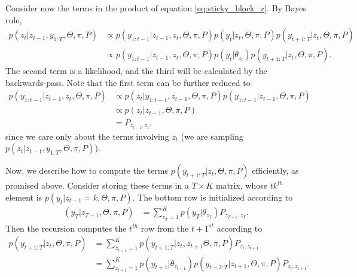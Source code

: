 \documentclass{article}
\begin{document}
Consider now the terms in the product of equation \ref{eq:sticky_block_z}. By
Bayes rule,
\begin{align*}
  p\left(z_{t} \vert z_{t - 1}, y_{1:T}, \Theta, \pi, P\right) &\propto p\left(y_{1:t - 1} \vert z_{t - 1}, z_{t}, \Theta, \pi, P\right)
  p\left(y_{t} \vert z_{t}, \Theta, \pi, P\right)
  p\left(y_{t + 1 : T} \vert z_{t}, \Theta, \pi, P\right) \\
  &\propto p\left(y_{1:t - 1} \vert z_{t - 1}, z_t, \Theta, \pi, P\right) p\left(y_t \vert \theta_{z_t}\right) p\left(y_{t + 1 : T}\vert z_{t}, \Theta, \pi, P\right).
\end{align*}
The second term is a likelihood, and the third will be calculated by the
backwards-pass. Note that the first term can be further reduced to
\begin{align*}
  p\left(y_{1:t - 1} \vert z_{t - 1}, z_t, \Theta, \pi, P\right) &\propto p\left(z_{t} \vert y_{1:t - 1}, z_{t - 1}, \Theta, \pi, P\right)p\left(y_{1:t - 1} \vert z_{t - 1}, \Theta, \pi, P\right) \\
  &\propto p\left(z_{t} \vert z_{t - 1}, \Theta, \pi, P\right) \\
  &= P_{z_{t - 1}, z_{t}},
\end{align*}
since we care only about the terms involving $z_{t}$ (we are sampling
$p\left(z_{t} \vert z_{t - 1}, y_{1:T}, \Theta, \pi, P\right)$).

Now, we describe how to compute the terms $p\left(y_{t + 1:T} \vert z_t, \Theta,
\pi, P\right)$ efficiently, as promised above. Consider storing these terms in a
$T \times K$ matrix, whose $tk^{th}$ element is $p\left(y_{t} \vert z_{t - 1} =
k, \Theta, \pi, P\right)$. The bottom row is initialized according to
\begin{align*}
 \left(y_T \vert z_{T - 1}, \Theta, \pi, P\right)  &= \sum_{z_{T} = 1}^{K} p\left(y_{T} \vert \theta_{z_{T}}\right) P_{z_{T - 1}, z_{T}}.
\end{align*}
Then the recursion computes the $t^{th}$ row from the $t + 1^{st}$ according to
\begin{align*}
  p\left(y_{t + 1:T} \vert z_t, \Theta, \pi, P\right) &= \sum_{z_{t + 1} = 1}^{K} p\left(y_{t + 1 : T} \vert z_{t}, z_{t + 1} \Theta, \pi, P\right) P_{z_{t}, z_{t + 1}} \\
  &= \sum_{z_{t + 1} = 1}^{K} p\left(y_{t + 1} \vert \theta_{z_{t + 1}}\right) p\left(y_{t + 2 : T} \vert z_{t + 1}, \Theta, \pi, P\right) P_{z_{t}, z_{t + 1}}.
\end{align*}
\end{document}
